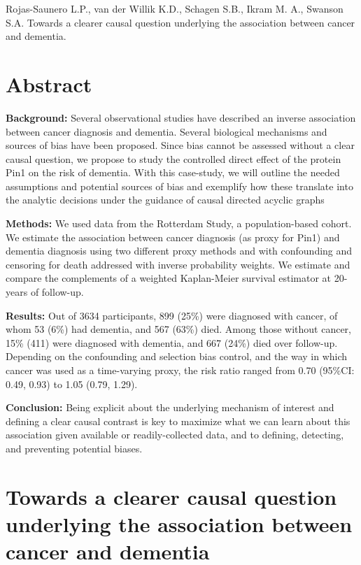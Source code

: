 \documentclass[
]{book}
\begin{document}
Rojas-Saunero L.P., van der Willik K.D., Schagen S.B., Ikram M. A., Swanson S.A. Towards a clearer causal question underlying the association between cancer and dementia.

\newpage
\normalsize

\newpage

\hypertarget{abstract-2}{%
\section{Abstract}\label{abstract-2}}

\textbf{Background:} Several observational studies have described an inverse association between cancer diagnosis and dementia. Several biological mechanisms and sources of bias have been proposed. Since bias cannot be assessed without a clear causal question, we propose to study the controlled direct effect of the protein Pin1 on the risk of dementia. With this case-study, we will outline the needed assumptions and potential sources of bias and exemplify how these translate into the analytic decisions under the guidance of causal directed acyclic graphs

\textbf{Methods:} We used data from the Rotterdam Study, a population-based cohort. We estimate the association between cancer diagnosis (as proxy for Pin1) and dementia diagnosis using two different proxy methods and with confounding and censoring for death addressed with inverse probability weights. We estimate and compare the complements of a weighted Kaplan-Meier survival estimator at 20-years of follow-up.

\textbf{Results:} Out of 3634 participants, 899 (25\%) were diagnosed with cancer, of whom 53 (6\%) had dementia, and 567 (63\%) died. Among those without cancer, 15\% (411) were diagnosed with dementia, and 667 (24\%) died over follow-up. Depending on the confounding and selection bias control, and the way in which cancer was used as a time-varying proxy, the risk ratio ranged from 0.70 (95\%CI: 0.49, 0.93) to 1.05 (0.79, 1.29).

\textbf{Conclusion:} Being explicit about the underlying mechanism of interest and defining a clear causal contrast is key to maximize what we can learn about this association given available or readily-collected data, and to defining, detecting, and preventing potential biases.

\newpage

\hypertarget{towards-a-clearer-causal-question-underlying-the-association-between-cancer-and-dementia}{%
\section{Towards a clearer causal question underlying the association between cancer and dementia}\label{towards-a-clearer-causal-question-underlying-the-association-between-cancer-and-dementia}}
\end{document}
